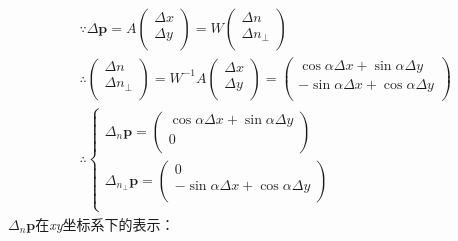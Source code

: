 \begin{align*}
&\because \Delta \boldsymbol{p}=A\left( \begin{array}{c}
	\Delta x\\
	\Delta y\\
\end{array} \right) =W\left( \begin{array}{c}
	\Delta n\\
	\Delta n_{\bot}\\
\end{array} \right) \\
&\therefore \left( \begin{array}{c}
	\Delta n\\
	\Delta n_{\bot}\\
\end{array} \right) =W^{-1}A\left( \begin{array}{c}
	\Delta x\\
	\Delta y\\
\end{array} \right) =\left( \begin{array}{c}
	\cos \alpha \Delta x+\sin \alpha \Delta y\\
	-\sin \alpha \Delta x+\cos \alpha \Delta y\\
\end{array} \right) \\
&\therefore \begin{cases}
	\Delta _n\boldsymbol{p}=\left( \begin{array}{c}
	\cos \alpha \Delta x+\sin \alpha \Delta y\\
	0\\
\end{array} \right)\\
	\Delta _{n_{\bot}}\boldsymbol{p}=\left( \begin{array}{c}
	0\\
	-\sin \alpha \Delta x+\cos \alpha \Delta y\\
\end{array} \right)\\
\end{cases}
\end{align*}
$\Delta _n\boldsymbol{p}$在{\it xy}坐标系下的表示：
